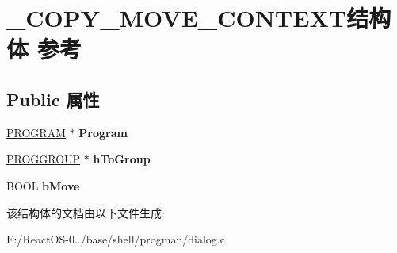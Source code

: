 \hypertarget{struct___c_o_p_y___m_o_v_e___c_o_n_t_e_x_t}{}\section{\+\_\+\+C\+O\+P\+Y\+\_\+\+M\+O\+V\+E\+\_\+\+C\+O\+N\+T\+E\+X\+T结构体 参考}
\label{struct___c_o_p_y___m_o_v_e___c_o_n_t_e_x_t}
\subsection*{Public 属性}
\begin{DoxyCompactItemize}
\item 
\mbox{\label{struct___c_o_p_y___m_o_v_e___c_o_n_t_e_x_t_a3c1919619fbe2c06137bfdbfc54b377e}} 
\hyperlink{struct___p_r_o_g_r_a_m}{P\+R\+O\+G\+R\+AM} $\ast$ {\bfseries Program}
\item 
\mbox{\label{struct___c_o_p_y___m_o_v_e___c_o_n_t_e_x_t_ae2eec4586fd025c818f0d5791d3f55a7}} 
\hyperlink{struct___p_r_o_g_g_r_o_u_p}{P\+R\+O\+G\+G\+R\+O\+UP} $\ast$ {\bfseries h\+To\+Group}
\item 
\mbox{\label{struct___c_o_p_y___m_o_v_e___c_o_n_t_e_x_t_a95626f2d387e62e581a083d582f26fb1}} 
B\+O\+OL {\bfseries b\+Move}
\end{DoxyCompactItemize}


该结构体的文档由以下文件生成\+:\begin{DoxyCompactItemize}
\item 
E\+:/\+React\+O\+S-\/0../base/shell/progman/dialog.\+c\end{DoxyCompactItemize}
